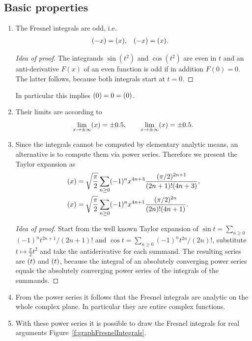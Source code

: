 \documentclass[12pt]{article}
\let\C=\relax
\DeclareMathOperator\C{C} %
\def\d#1{{\,\ud#1\,}}
\let\S=\relax
\DeclareMathOperator\S{S} %
\begin{document}
\subsection{Basic properties}
\begin{enumerate}
\item The Fresnel integrals are odd, i.e.
\begin{align*}
	\S(-x) &= \S(x), & \C(-x) &= \C(x).
\end{align*}
\begin{proof}[Idea of proof]  The integrands $\sin(t^2)$ and $\cos(t^2)$ are even in $t$ and an anti-derivative $F(x)$ of an even function is odd if in addition $F(0)=0$.  The latter follows, because both integrals start at $t=0$.
\end{proof}
In particular this implies $\C(0)=0=\S(0)$.

\item Their limits are according to \cite{AS}
\[  \lim_{x\to\pm\infty} \S(x) = \pm0.5,\qquad  \lim_{x\to\pm\infty} \C(x) = \pm0.5.
\]

\item Since the integrals cannot be computed by elementary analytic means, an alternative is to compute them via power series.  Therefore we present the Taylor expansion as
\begin{align*}
  \S(x) &= \sqrt{\frac\pi2}\sum_{n\ge0} (-1)^nx^{4n+3}\frac{(\pi/2)^{2n+1}}{(2n+1)!(4n+3)}, \\
  \C(x) &= \sqrt{\frac\pi2}\sum_{n\ge0} (-1)^nx^{4n+1}\frac{(\pi/2)^{2n}}{(2n)!(4n+1)}.
\end{align*}
\begin{proof}[Idea of proof]  Start from the well known Taylor expansion of $\sin t = \sum_{n\ge0}$ $(-1)^n t^{2n+1}/(2n+1)!$ and $\cos t = \sum_{n\ge0} (-1)^nt^{2n}/(2n)!$, substitute $t\mapsto \tfrac\pi2 t^2$ and take the antiderivative for each summand.  The resulting series are $\S(t)$ and $\C(t)$, because the integral of an absolutely converging power series equals the absolutely converging power series of the integrals of the summands.
\end{proof}
\item From the power series it follows that the Fresnel integrals are analytic on the whole complex plane.  In particular they are entire complex functions.

\item With these power series it is possible to draw the Fresnel integrals for real arguments Figure~\ref{f:graphFresnelIntegrals}.
\end{enumerate}
\end{document}
